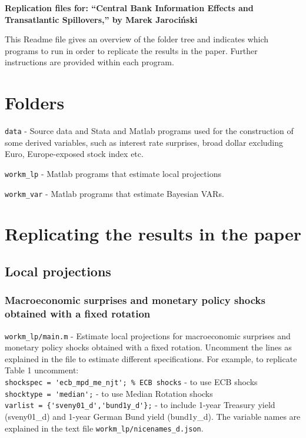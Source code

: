 \documentclass[12pt]{article}
\begin{document}
\textbf{\Large Replication files for: ``Central Bank Information Effects and Transatlantic Spillovers,'' by Marek Jaroci\'nski}\medskip


This Readme file gives an overview of the folder tree and indicates which programs to run in order to replicate the results in the paper. Further instructions are provided within each program.

\section{Folders}

\verb|data| - Source data and Stata and Matlab programs used for the construction of some derived variables, such as interest rate surprises, broad dollar excluding Euro, Europe-exposed stock index etc.

\verb|workm_lp| - Matlab programs that estimate local projections

\verb|workm_var| - Matlab programs that estimate Bayesian VARs.

\section{Replicating the results in the paper}

\subsection{Local projections}

\subsubsection{Macroeconomic surprises and monetary policy shocks obtained with a fixed rotation}

\verb|workm_lp/main.m| - Estimate local projections for macroeconomic surprises and monetary policy shocks obtained with a fixed rotation. Uncomment the lines as explained in the file to estimate different specifications. For example, to replicate Table 1 uncomment:\\
\verb|shockspec = 'ecb_mpd_me_njt'; % ECB shocks| - to use ECB shocks\\
\verb|shocktype = 'median';| - to use Median Rotation shocks\\
\verb|varlist = {'sveny01_d','bund1y_d'};| - to include 1-year Treasury yield (sveny01\_d) and 1-year German Bund yield (bund1y\_d). The variable names are explained in the text file \verb|workm_lp/nicenames_d.json|.
\end{document}
